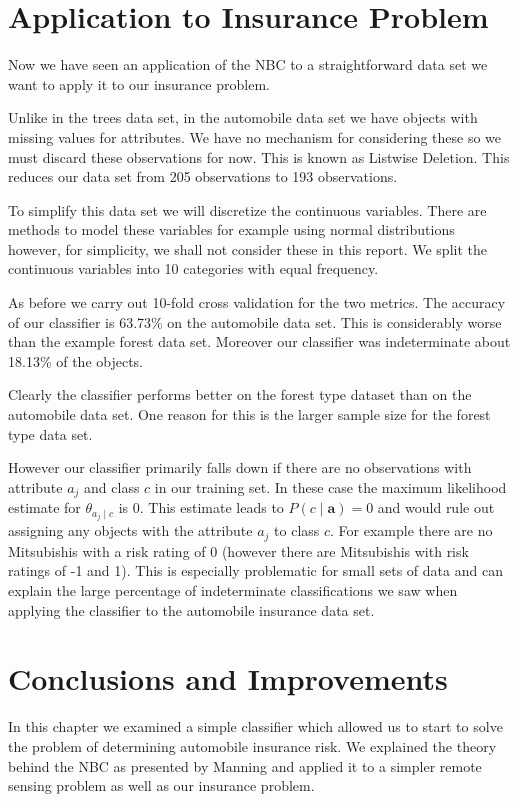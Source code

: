 \section{Application to Insurance Problem}

Now we have seen an application of the NBC to a straightforward data set we want to apply it to our insurance problem.

Unlike in the trees data set, in the automobile data set we have objects with missing values for attributes.
We have no mechanism for considering these so we must discard these observations for now.
This is known as Listwise Deletion.
This reduces our data set from 205 observations to 193 observations.

To simplify this data set we will discretize the continuous variables.
There are methods to model these variables for example using normal distributions \cite{Dumitru09} however, for simplicity, we shall not consider these in this report.
We split the continuous variables into 10 categories with equal frequency.

As before we carry out 10-fold cross validation for the two metrics.
The accuracy of our classifier is 63.73\% on the automobile data set.
This is considerably worse than the example forest data set.
Moreover our classifier was indeterminate about 18.13\% of the objects.

Clearly the classifier performs better on the forest type dataset than on the automobile data set.
One reason for this is the larger sample size for the forest type data set.

However our classifier primarily falls down if there are no observations with attribute $a_j$ and class $c$ in our training set.
In these case the maximum likelihood estimate for $\theta_{a_j \mid c}$ is $0$.
This estimate leads to $P(c \mid \mathbf{a}) = 0$ and would rule out assigning any objects with the attribute $a_j$ to class $c$.
For example there are no Mitsubishis with a risk rating of 0 (however there are Mitsubishis with risk ratings of -1 and 1).
This is especially problematic for small sets of data and can explain the large percentage of indeterminate classifications we saw when applying the classifier to the automobile insurance data set.

\section{Conclusions and Improvements}

In this chapter we examined a simple classifier which allowed us to start to solve the problem of determining automobile insurance risk.
We explained the theory behind the NBC as presented by Manning and applied it to a simpler remote sensing problem as well as our insurance problem.


